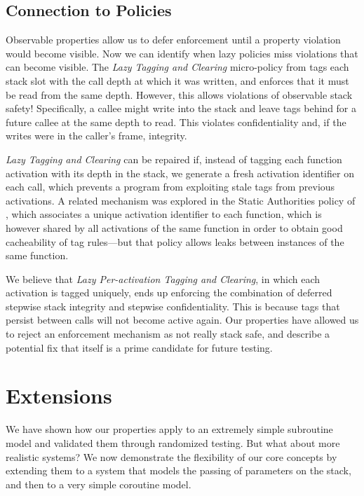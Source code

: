 \documentclass[acmsmall,review,anonymous]{acmart}\settopmatter{printfolios=true,printccs=false,printacmref=false}
\begin{document}
{\subsection{Connection to Policies}

Observable properties allow us to defer enforcement until a property
violation would become visible. Now we can identify when lazy policies
miss violations that can become visible. The {\em Lazy Tagging and Clearing}
micro-policy from \citet{DBLP:conf/sp/RoesslerD18} tags each stack slot with the call depth
at which it was written, and enforces that it must be read from the
same depth. However, this allows violations of observable stack safety!
Specifically, a callee might write into the stack and leave tags behind
for a future callee at the same depth to read. This violates confidentiality and,
if the writes were in the caller's frame, integrity.

{\em Lazy Tagging and Clearing} can be repaired if, instead of tagging each function
activation with its depth in the stack, we generate a fresh activation
identifier on each call, which prevents a program from exploiting stale
tags from previous activations. A related mechanism was explored in the
Static Authorities policy of \citet{DBLP:conf/sp/RoesslerD18}, which
associates a unique activation identifier to each function, which is
however shared by all activations of the same function in order to obtain
good cacheability of tag rules---but that policy allows leaks between
instances of the same function.

We believe that {\em Lazy Per-activation Tagging and Clearing}, in which
each activation is tagged uniquely, ends up enforcing the combination
of deferred stepwise stack integrity and stepwise confidentiality.
This is because tags that persist between calls will not become active again.
Our properties have allowed us to reject an enforcement mechanism as
not really stack safe, and describe a potential fix that itself is a
prime candidate for future testing.

\section{Extensions}
\label{sec:ext}

We have shown how our properties apply to an extremely simple
subroutine model and validated them through randomized testing.
But what about more realistic systems? We now demonstrate the
flexibility of our core concepts by extending
them to a system that models the passing of
parameters on the stack, and then to a very simple coroutine model.

}
\end{document}
